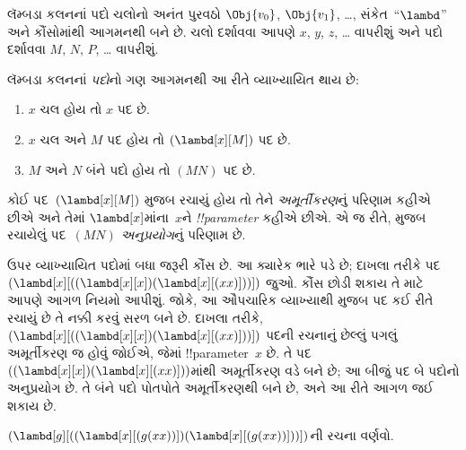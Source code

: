 \documentclass[../../../include/open-logic-section]{subfiles}
\begin{document}

લૅમ્બડા કલનનાં પદો ચલોનો અનંત પુરવઠો $\Obj{v_0}$, $\Obj{v_1}$,
\dots{}, સંકેત~``$\lambd$'' અને કૌંસોમાંથી આગમનથી બને છે. ચલો
દર્શાવવા આપણે $x$, $y$, $z$, \dots{} વાપરીશું અને પદો દર્શાવવા
$M$, $N$, $P$, \dots{} વાપરીશું.

\begin{defn}[પદો] 
લૅમ્બડા કલનનાં \emph{પદો}નો ગણ આગમનથી આ રીતે વ્યાખ્યાયિત થાય છે:
\begin{enumerate}
  \item {} $x$ ચલ હોય તો $x$ પદ છે.
  \item {} $x$ ચલ અને $M$ પદ હોય તો
    $(\lambd[x][M])$ પદ છે.
  \item {} $M$ અને $N$ બંને પદો હોય તો
    $(MN)$ પદ છે.
\end{enumerate}
\end{defn}

કોઈ પદ~$(\lambd[x][M])$  મુજબ રચાયું હોય
તો તેને \emph{અમૂર્તીકરણ}નું પરિણામ કહીએ છીએ અને તેમાં
$\lambd[x]$માંના~$x$ને \emph{!!{parameter}} કહીએ છીએ. એ જ રીતે,
 મુજબ રચાયેલું પદ~$(MN)$
\emph{અનુપ્રયોગ}નું પરિણામ છે.

ઉપર વ્યાખ્યાયિત પદોમાં બધા જરૂરી કૌંસ છે. આ ક્યારેક ભારે પડે છે;
દાખલા તરીકે પદ
$(\lambd[x][((\lambd[x][x])(\lambd[x][(xx)]))])$ જુઓ. કૌંસ
છોડી શકાય તે માટે આપણે આગળ નિયમો આપીશું. જોકે, આ ઔપચારિક
વ્યાખ્યાથી  મુજબ પદ કઈ રીતે રચાયું છે તે નક્કી
કરવું સરળ બને છે. દાખલા તરીકે,
$(\lambd[x][((\lambd[x][x])(\lambd[x][(xx)]))])$ પદની રચનાનું
છેલ્લું પગલું અમૂર્તીકરણ જ હોવું જોઈએ, જેમાં !!{parameter}~$x$ છે.
તે પદ~$((\lambd[x][x])(\lambd[x][(xx)]))$માંથી અમૂર્તીકરણ વડે
બને છે; આ બીજું પદ બે પદોનો અનુપ્રયોગ છે. તે બંને પદો પોતપોતે
અમૂર્તીકરણથી બને છે, અને આ રીતે આગળ જઈ શકાય છે.

\begin{prob}
$(\lambd[g][((\lambd[x][(g (x x))])
  (\lambd[x][(g (x x))]))])$ની રચના વર્ણવો.
\end{prob}
\end{document}
